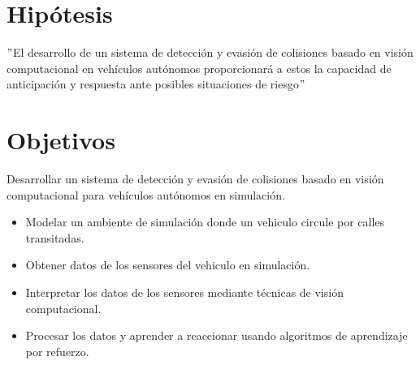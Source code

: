 \documentclass[10pt,letterpaper,final]{article}
\begin{document}
    \section*{Hipótesis}
    \("\)El desarrollo de un sistema de detección y evasión de colisiones basado en visión computacional en vehículos autónomos
    proporcionará a estos la capacidad de anticipación y respuesta ante posibles situaciones de riesgo\("\)
    
    \section*{Objetivos}
    \newline
    \noindent Desarrollar un sistema de detección y evasión de colisiones basado en visión computacional para vehículos autónomos en simulación.
    \newline
    \newline
    \begin{itemize}
        \item Modelar un ambiente de simulación donde un vehiculo circule por calles transitadas.
        \item Obtener datos de los sensores del vehiculo en simulación.
        \item Interpretar los datos de los sensores mediante técnicas de visión computacional.
        \item Procesar los datos y aprender a reaccionar usando algoritmos de aprendizaje por refuerzo.
    \end{itemize}
    \clearpage
\end{document}
